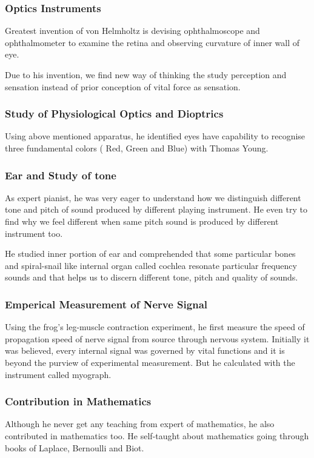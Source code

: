 \documentclass[11pt]{article}
\begin{document}
\subsubsection{Optics Instruments}
Greatest invention of von Helmholtz is devising ophthalmoscope and ophthalmometer to examine the retina and observing curvature of inner wall of eye.

Due to his invention, we find new way of thinking the study perception and sensation instead of prior conception of vital force as sensation.

\subsubsection{Study of Physiological Optics and Dioptrics}
Using above mentioned apparatus, he identified eyes have capability to recognise three fundamental colors ( Red, Green and  Blue) with Thomas Young.

\subsubsection{Ear and Study of tone}
As expert pianist, he was very eager to understand how we distinguish different tone and pitch of sound produced by different playing instrument. He even try to find why we feel different when same pitch sound is produced by different instrument too.

He studied inner portion of ear and comprehended that some particular bones and spiral-snail like internal organ called cochlea resonate particular frequency sounds and that helps us to discern different tone, pitch and quality of sounds.



\subsubsection{Emperical Measurement of Nerve Signal}
Using the frog's leg-muscle contraction experiment, he first measure the speed of propagation speed of nerve signal from source through nervous system.
Initially it was believed, every internal signal was governed by vital functions and it is beyond the purview of experimental measurement. But he calculated with the instrument called myograph.



\subsubsection{Contribution in Mathematics}
Although he never get any teaching from expert of mathematics, he also contributed in mathematics too. He self-taught about mathematics going through books of Laplace, Bernoulli and Biot.
\end{document}
